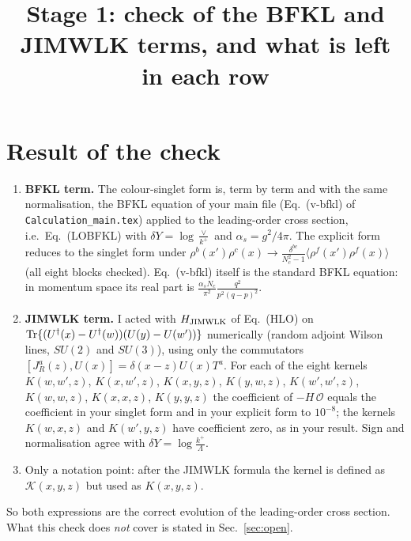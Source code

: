 \documentclass[9pt]{article}
\title{Stage 1: check of the BFKL and JIMWLK terms, and what is left in each row}
\author{}
\date{}
\numberwithin{equation}{section}
\begin{document}
\maketitle
\section{Result of the check}
\begin{enumerate}
\item \textbf{BFKL term.} The colour-singlet form is, term by term and with the same normalisation, the BFKL equation of your main file (Eq.~(v-bfkl) of \texttt{Calculation\_main.tex}) applied to the leading-order cross section, i.e.\ Eq.~(LOBFKL) with $\delta Y=\log\frac{\vee}{k^{+}}$ and $\alpha_{s}=g^{2}/4\pi$. The explicit form reduces to the singlet form under $\rho^{b}(x')\rho^{c}(x)\to\frac{\delta^{bc}}{N_{c}^{2}-1}\langle\rho^{f}(x')\rho^{f}(x)\rangle$ (all eight blocks checked). Eq.~(v-bfkl) itself is the standard BFKL equation: in momentum space its real part is $\frac{\alpha_{s}N_{c}}{\pi^{2}}\frac{q^{2}}{p^{2}(q-p)^{2}}$.
\item \textbf{JIMWLK term.} I acted with $H_{\rm JIMWLK}$ of Eq.~(HLO) on ${\rm Tr}\{(U^{\dagger}(x)-U^{\dagger}(w))(U(y)-U(w'))\}$ numerically (random adjoint Wilson lines, $SU(2)$ and $SU(3)$), using only the commutators $[J^{a}_{R}(z),U(x)]=\delta(x-z)U(x)T^{a}$. For each of the eight kernels $K(w,w',z)$, $K(x,w',z)$, $K(x,y,z)$, $K(y,w,z)$, $K(w',w',z)$, $K(w,w,z)$, $K(x,x,z)$, $K(y,y,z)$ the coefficient of $-H\,\mathcal{O}$ equals the coefficient in your singlet form and in your explicit form to $10^{-8}$; the kernels $K(w,x,z)$ and $K(w',y,z)$ have coefficient zero, as in your result. Sign and normalisation agree with $\delta Y=\log\frac{k^{+}}{\Lambda}$.
\item Only a notation point: after the JIMWLK formula the kernel is defined as $\mathcal{K}(x,y,z)$ but used as $K(x,y,z)$.
\end{enumerate}
So both expressions are the correct evolution of the leading-order cross section. What this check does \emph{not} cover is stated in Sec.~\ref{sec:open}.
\end{document}
